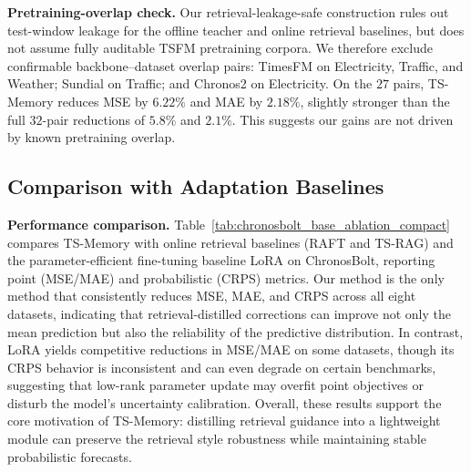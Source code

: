 \noindent\textbf{Pretraining-overlap check.}
Our retrieval-leakage-safe construction rules out test-window leakage for the offline teacher and online retrieval baselines, but does not assume fully auditable TSFM pretraining corpora. We therefore exclude confirmable backbone--dataset overlap pairs: TimesFM on Electricity, Traffic, and Weather; Sundial on Traffic; and Chronos2 on Electricity. On the $27$ pairs, TS-Memory reduces MSE by $6.22\%$ and MAE by $2.18\%$, slightly stronger than the full $32$-pair reductions of $5.8\%$ and $2.1\%$. This suggests our gains are not driven by known pretraining overlap.




\subsection{Comparison with Adaptation Baselines}
\label{sec:comparison_adaptation_baselines}


\noindent\textbf{Performance comparison.}
Table~\ref{tab:chronosbolt_base_ablation_compact} compares TS-Memory with online retrieval baselines (RAFT and TS-RAG) and the parameter-efficient fine-tuning baseline LoRA on ChronosBolt, reporting point (MSE/MAE) and probabilistic (CRPS) metrics. Our method is the only method that consistently reduces MSE, MAE, and CRPS across all eight datasets, indicating that retrieval-distilled corrections can improve not only the mean prediction but also the reliability of the predictive distribution. In contrast, LoRA yields competitive reductions in MSE/MAE on some datasets, though its CRPS behavior is inconsistent and can even degrade on certain benchmarks, suggesting that low-rank parameter update may overfit point objectives or disturb the model's uncertainty calibration. Overall, these results support the core motivation of TS-Memory: distilling retrieval guidance into a lightweight module can preserve the retrieval style robustness while maintaining stable probabilistic forecasts.



